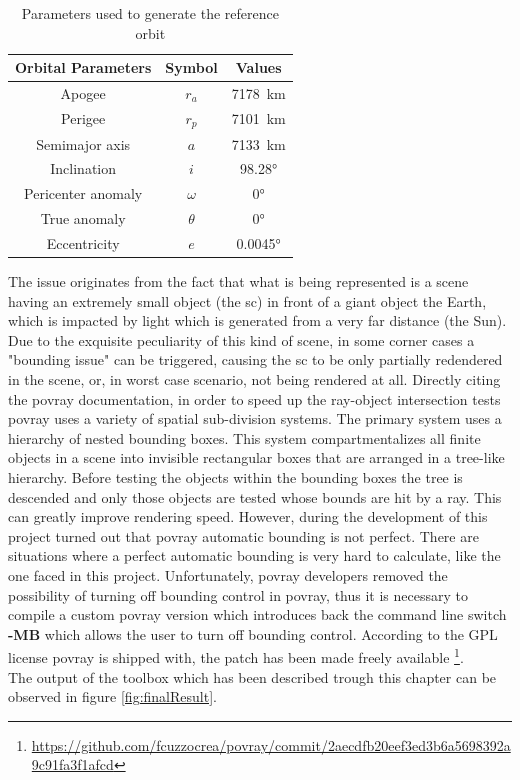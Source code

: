 \begin{table}[htbp]
  \centering
  \begin{tabular}{ccc}
    \hline
    \hline
    Orbital Parameters & Symbol   & Values         \\
    \hline
    Apogee             & $r_a$    & \SI{7178}{\km} \\
    \hline
    Perigee            & $r_p$    & \SI{7101}{\km} \\
    \hline
    Semimajor axis     & $a$      & \SI{7133}{\km} \\
    \hline
    Inclination        & $i$      & \ang{98.28}    \\
    \hline
    Pericenter anomaly & $\omega$ & \ang{0}        \\
    \hline
    True anomaly       & $\theta$ & \ang{0}        \\
    \hline
    Eccentricity       & $e$      & \ang{0.0045}   \\
    \hline
    \hline
  \end{tabular}
  \caption{Parameters used to generate the reference orbit \cite{prismaOrbitParameters}}
  \label{tab:orbitalParameters}
\end{table}

The issue originates from the fact that what is being represented is a scene having an extremely small object (the \acrshort{sc}) in front of a giant object {the Earth}, which is impacted by light which is generated from a very far distance (the Sun).
Due to the exquisite peculiarity of this kind of scene, in some corner cases a "bounding issue" can be triggered, causing the \acrshort{sc} to be only partially redendered in the scene, or, in worst case scenario, not being rendered at all.
Directly citing the \acrshort{povray} documentation, in order to speed up the ray-object intersection tests \acrshort{povray} uses a variety of spatial sub-division systems. The primary system uses a hierarchy of nested bounding boxes. This system compartmentalizes all finite objects in a scene into invisible rectangular boxes that are arranged in a tree-like hierarchy. Before testing the objects within the bounding boxes the tree is descended and only those objects are tested whose bounds are hit by a ray. This can greatly improve rendering speed.
However, during the development of this project turned out that \acrshort{povray} automatic bounding is not perfect. There are situations where a perfect automatic bounding is very hard to calculate, like the one faced in this project. Unfortunately, \acrshort{povray} developers removed the possibility of turning off bounding control in \acrshort{povray}, thus it is necessary to compile a custom \acrshort{povray} version which introduces back the command line switch \textbf{-MB} which allows the user to turn off bounding control. According to the GPL license \acrshort{povray} is shipped with, the patch has been made freely available \footnote{\url{https://github.com/fcuzzocrea/povray/commit/2aecdfb20eef3ed3b6a5698392a9c91fa3f1afcd}}.\\
The output of the toolbox which has been described trough this chapter can be observed in figure \ref{fig:finalResult}. 

